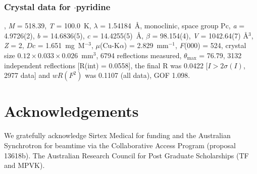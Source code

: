 \begin{refsection}
\subsubsection{Crystal data for \texorpdfstring{$\cdot$pyridine}{C19H12N4O4Se.C5H5N}}
, \emph{M} = 518.39, \emph{T} = 100.0~K, $\lambda$ = 1.54184~\AA, monoclinic, space group Pc, \emph{a} = 4.9726(2), \emph{b} = 14.6836(5), \emph{c} = 14.4255(5)~\AA, $\beta$ = 98.154(4)\degree, \emph{V} = 1042.64(7) \AA$^3$, \emph{Z} = 2, $Dc$ = 1.651~mg~M$^{-3}$, $\mu$(Cu-K$\alpha$) = 2.829~mm$^{-1}$, \emph{F}(000) = 524, crystal size $0.12 \times 0.033 \times 0.026$~mm$^3$, 6794 reflections measured, $\theta_{\mathrm{max}}$ = 76.79\degree, 3132 independent reflections [R(int) = 0.0558], the final R was 0.0422 [$I > 2\sigma(I)$, 2977 data] and $wR(F^2)$ was 0.1107 (all data), GOF 1.098.

\section{Acknowledgements}
We gratefully acknowledge Sirtex Medical for funding and the Australian Synchrotron for beamtime via the Collaborative Access Program (proposal 13618b).
The Australian Research Council for Post Graduate Scholarships (TF and MPVK).

\printbibliography[heading=subbibliography]
\end{refsection}

